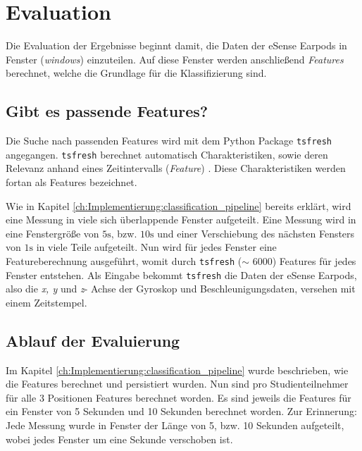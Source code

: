 
\chapter{Evaluation}
\label{ch:Evaluation}
Die Evaluation der Ergebnisse beginnt damit, die Daten der eSense Earpods in Fenster (\textit{windows}) einzuteilen.
Auf diese Fenster werden anschließend \textit{Features} berechnet, welche die Grundlage für die Klassifizierung sind.

\section{Gibt es passende Features?}
Die Suche nach passenden Features wird mit dem Python Package \texttt{tsfresh} angegangen.
\texttt{tsfresh} berechnet automatisch Charakteristiken, sowie deren Relevanz anhand eines Zeitintervalls (\textit{Feature}) .
Diese Charakteristiken werden fortan als Features bezeichnet. 

Wie in Kapitel \ref{ch:Implementierung:classification_pipeline} bereits erklärt, wird eine Messung in viele sich überlappende Fenster aufgeteilt. 
Eine Messung wird in eine Fenstergröße von $5\si{\s}$, bzw. $10\si{\s}$ und einer Verschiebung des nächsten Fensters von $1\si{\s}$ in viele Teile aufgeteilt. 
Nun wird für jedes Fenster eine Featureberechnung ausgeführt, womit durch \texttt{tsfresh} ($\sim$ 6000) Features für jedes Fenster entstehen.
Als Eingabe bekommt \texttt{tsfresh} die Daten der eSense Earpods, also die \textit{x, y} und \textit{z}- Achse der Gyroskop und Beschleunigungsdaten, versehen mit einem Zeitstempel. 

\section{Ablauf der Evaluierung}
Im Kapitel \ref{ch:Implementierung:classification_pipeline} wurde beschrieben, wie die Features berechnet und persistiert wurden. 
Nun sind pro Studienteilnehmer für alle 3 Positionen Features berechnet worden. 
Es sind jeweils die Features für ein Fenster von 5 Sekunden und 10 Sekunden berechnet worden.
Zur Erinnerung: Jede Messung wurde in Fenster der Länge von 5, bzw. 10 Sekunden aufgeteilt, wobei jedes Fenster um eine Sekunde verschoben ist.

